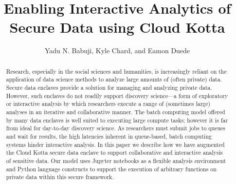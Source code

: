 \documentclass[sigconf]{acmart}
\begin{document}
\title{Enabling Interactive Analytics of Secure Data using Cloud Kotta}



\author{Yadu N. Babuji, Kyle Chard, and Eamon Duede}

\renewcommand{\shortauthors}{Y. Babuji et al.}


\begin{abstract}
Research, especially in the social sciences and humanities, is increasingly
reliant on the application of data science methods to analyze large amounts
of (often private) data. Secure data enclaves provide a solution for managing and analyzing private data. However, such enclaves do not readily support
discovery science---a form of exploratory or interactive analysis by which researchers 
execute a range of (sometimes large) analyses in an iterative and collaborative
manner. 
The batch computing model offered by many data enclaves is well suited to executing
large compute tasks; however it is far from ideal for day-to-day discovery science.
As researchers must submit jobs to queues and wait for results, the high latencies inherent in queue-based, batch computing systems hinder interactive
analysis.
In this paper we describe how we have augmented the Cloud Kotta secure data enclave
to support collaborative and interactive analysis of sensitive data.
Our model uses Jupyter notebooks as a flexible analysis environment 
and Python language constructs to support the execution of arbitrary 
functions on private data within this secure framework.
\end{abstract}


\newcommand{\NAMENS} {\textsc{Cloud Kotta}} %
\newcommand{\NAME} {\textsc{Cloud Kotta }}



\maketitle
\end{document}
